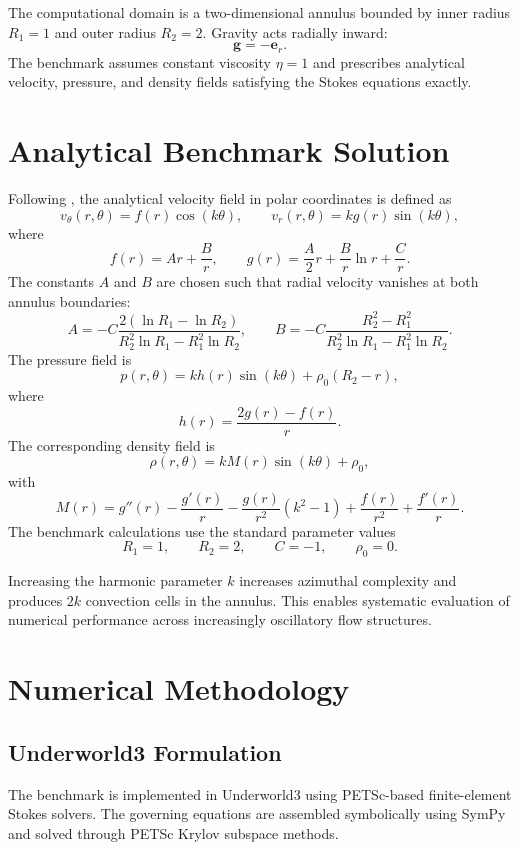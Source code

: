 \documentclass[gmd, manuscript]{copernicus}
\begin{document}
The computational domain is a two-dimensional annulus bounded by inner radius \(R_1=1\) and outer radius \(R_2=2\).
Gravity acts radially inward:
\[
  \mathbf{g} = -\mathbf{e}_r.
\]
The benchmark assumes constant viscosity \(\eta=1\) and prescribes analytical velocity, pressure, and density fields satisfying the Stokes equations exactly.

\section{Analytical Benchmark Solution}

Following \citet{thieulot2018}, the analytical velocity field in polar coordinates is defined as
\[
  v_\theta(r,\theta) = f(r)\cos(k\theta),
  \qquad
  v_r(r,\theta) = k g(r)\sin(k\theta),
\]
where
\[
  f(r)=Ar+\frac{B}{r},
  \qquad
  g(r)=\frac{A}{2}r+\frac{B}{r}\ln r+\frac{C}{r}.
\]
The constants \(A\) and \(B\) are chosen such that radial velocity vanishes at both annulus boundaries:
\[
  A=-C\frac{2(\ln R_1-\ln R_2)}{R_2^2\ln R_1-R_1^2\ln R_2},
  \qquad
  B=-C\frac{R_2^2-R_1^2}{R_2^2\ln R_1-R_1^2\ln R_2}.
\]
The pressure field is
\[
  p(r,\theta)=k h(r)\sin(k\theta)+\rho_0(R_2-r),
\]
where
\[
  h(r)=\frac{2g(r)-f(r)}{r}.
\]
The corresponding density field is
\[
  \rho(r,\theta)=kM(r)\sin(k\theta)+\rho_0,
\]
with
\[
  M(r)=g''(r)-\frac{g'(r)}{r}
  -\frac{g(r)}{r^2}(k^2-1)
  +\frac{f(r)}{r^2}
  +\frac{f'(r)}{r}.
\]
The benchmark calculations use the standard parameter values
\[
  R_1=1,
  \qquad
  R_2=2,
  \qquad
  C=-1,
  \qquad
  \rho_0=0.
\]

Increasing the harmonic parameter \(k\) increases azimuthal complexity and produces \(2k\) convection cells in the annulus.
This enables systematic evaluation of numerical performance across increasingly oscillatory flow structures.

\section{Numerical Methodology}

\subsection{Underworld3 Formulation}

The benchmark is implemented in Underworld3 using PETSc-based finite-element Stokes solvers.
The governing equations are assembled symbolically using SymPy and solved through PETSc Krylov subspace methods.
\end{document}
